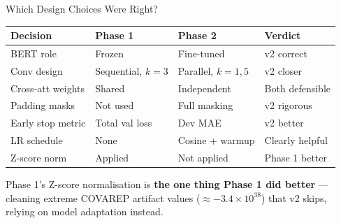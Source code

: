 \documentclass[aspectratio=169]{beamer}
\begin{document}
\begin{frame}{Which Design Choices Were Right?}
  \vspace{-4pt}
  \renewcommand{\arraystretch}{1.12}
  \small
  \begin{tabular}{p{3.2cm}p{3.0cm}p{3.0cm}p{2.4cm}}
    \toprule
    \textbf{Decision} & \textbf{Phase 1} & \textbf{Phase 2} & \textbf{Verdict} \\
    \midrule
    BERT role    & Frozen & Fine-tuned &
      \cellcolor{goodgreen!20}v2 correct \\
    Conv design  & Sequential, $k=3$ & Parallel, $k\!=\!1, 5$ &
      \cellcolor{goodgreen!20}v2 closer \\
    Cross-att weights & Shared & Independent &
      Both defensible \\
    Padding masks & Not used & Full masking &
      \cellcolor{goodgreen!20}v2 rigorous \\
    Early stop metric & Total val loss & Dev MAE &
      \cellcolor{goodgreen!20}v2 better \\
    LR schedule  & None & Cosine + warmup &
      \cellcolor{goodgreen!20}Clearly helpful \\
    Z-score norm & Applied & Not applied &
      Phase 1 better \\
    \bottomrule
  \end{tabular}

  \vspace{4pt}
  \small
  Phase 1's Z-score normalisation is \textbf{the one thing Phase 1 did better} —
  cleaning extreme COVAREP artifact values ($\approx -3.4 \times 10^{38}$) that
  v2 skips, relying on model adaptation instead.
\end{frame}
\end{document}
